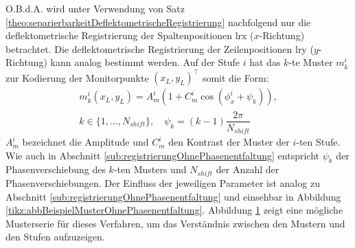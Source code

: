 \p
O.B.d.A. wird unter Verwendung von Satz \ref{theo:separierbarkeitDeflektometrischeRegistrierung} nachfolgend nur die deflektometrische Registrierung der Spaltenpositionen \acrshort{lrx} ($x$-Richtung) betrachtet.
Die deflektometrische Registrierung der Zeilenpositionen \acrshort{lry} ($y$-Richtung) kann analog bestimmt werden.
Auf der Stufe $i$ hat das $k$-te Muster $m_k^i$ zur Kodierung der Monitorpunkte $(x_L, y_L)^\top$ somit die Form:
%
\begin{equation}\label{eq:monitormuster_mehrstufig}
	\begin{gathered}	
		m_k^i(x_L,y_L) = A_m^i \left(1 + C_m^i \cos \left(\phi_x^i + \psi_k\right)\right),\\
		k \in \lbrace 1,\ldots,N_{shift}\rbrace,
		\quad
		\psi_k = (k - 1)\dfrac{2\pi}{N_{shift}}
	\end{gathered}
\end{equation}
%
$A_m^i$ bezeichnet die Amplitude und $C_m^i$ den Kontrast der Muster der $i$-ten Stufe.
Wie auch in Abschnitt \ref{sub:registrierungOhnePhasenentfaltung} entspricht $\psi_k$ der Phasenverschiebung des $k$-ten Musters und $N_{shift}$ der Anzahl der Phasenverschiebungen.
Der Einfluss der jeweiligen Parameter ist analog zu Abschnitt \ref{sub:registrierungOhnePhasenentfaltung} und einsehbar in Abbildung \ref{tikz:abbBeispielMusterOhnePhasenentfaltung}.
Abbildung \ref{tikz:abbBeispielMusterMitPhasenentfaltung} zeigt eine mögliche Musterserie für dieses Verfahren, um das Verständnis zwischen den Mustern und den Stufen aufzuzeigen.
%
{
	\begin{figure}[H]
		\centering
		
		\label{tikz:abbBeispielMusterMitPhasenentfaltung}
	\end{figure}
}

